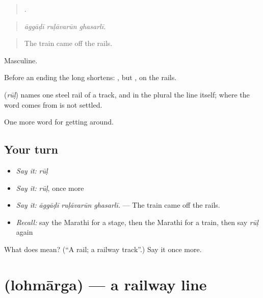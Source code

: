 \begin{quote}
  .
\end{quote}

\begin{quote}
\emph{āggāḍī ruḷāvarūn ghasarlī.}
\end{quote}

\begin{quote}
The train came off the rails.
\end{quote}

Masculine.

Before an ending the long  shortens: , but , on the rails.

\begin{cousinweb}
\textbf{} (\emph{rūḷ}) names one steel rail of a track, and in the plural the line itself; where the word comes from is not settled.
\end{cousinweb}

\begin{grammarlens}[title={What you've built}]
One more word for getting around.
\end{grammarlens}

\subsection*{Your turn}
\begin{itemize}
\raggedright
  \item \emph{Say it:} \emph{rūḷ}
  \item \emph{Say it:} \emph{rūḷ}, once more
  \item \emph{Say it:} \emph{āggāḍī ruḷāvarūn ghasarlī.} — The train came off the rails.
  \item \emph{Recall:} say the Marathi for a stage, then the Marathi for a train, then say \emph{rūḷ} again
\end{itemize}

\begin{tcolorbox}[breakable,colback=teal!4,colframe=teal!35!black,title={Before you move on}]
What does  mean? (\textquotedblleft{}A rail; a railway track\textquotedblright{}.) Say it once more.
\end{tcolorbox}
\section[\texorpdfstring{\mr{लोहमार्ग} (lohmārga)}{लोहमार्ग (lohmārga)}]{ (lohmārga) — a railway line}

